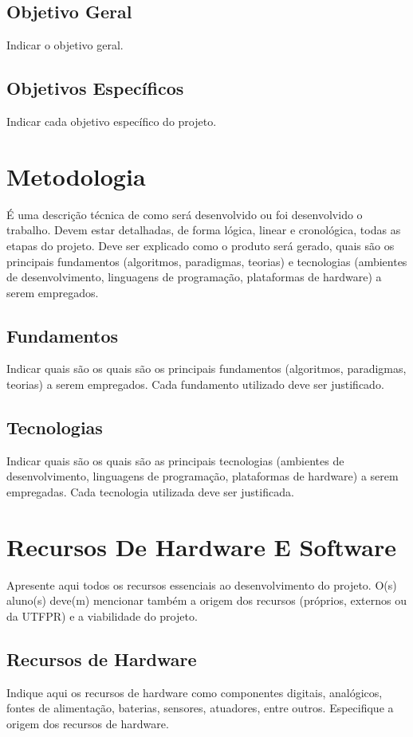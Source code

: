 \documentclass[a4paper,12pt]{article}
\begin{document}
\subsection{Objetivo Geral}
Indicar o objetivo geral.

\subsection{Objetivos Específicos}
Indicar cada objetivo específico do projeto.

\newpage

\section{Metodologia}
É uma descrição técnica de como será desenvolvido ou foi desenvolvido o trabalho. Devem estar detalhadas, de forma lógica, linear e cronológica, todas as etapas do projeto.
Deve ser explicado como o produto será gerado, quais são os principais fundamentos (algoritmos, paradigmas, teorias) e tecnologias (ambientes de desenvolvimento, linguagens de programação, plataformas de hardware) a serem empregados.
\subsection{Fundamentos}
Indicar quais são os quais são os principais fundamentos (algoritmos, paradigmas, teorias) a serem empregados.
Cada fundamento utilizado deve ser justificado.
\subsection{Tecnologias}
Indicar quais são os quais são as principais tecnologias (ambientes de desenvolvimento, linguagens de programação, plataformas de hardware) a serem empregadas.
Cada tecnologia utilizada deve ser justificada.

\section{Recursos De Hardware E Software}
Apresente aqui todos os recursos essenciais ao desenvolvimento do projeto. O(s) aluno(s) deve(m) mencionar também a origem dos recursos (próprios, externos ou da UTFPR) e a viabilidade do projeto.

\subsection{Recursos de Hardware}
Indique aqui os recursos de hardware como componentes digitais, analógicos, fontes de alimentação, baterias, sensores, atuadores, entre outros. Especifique a origem dos recursos de hardware.
\end{document}
